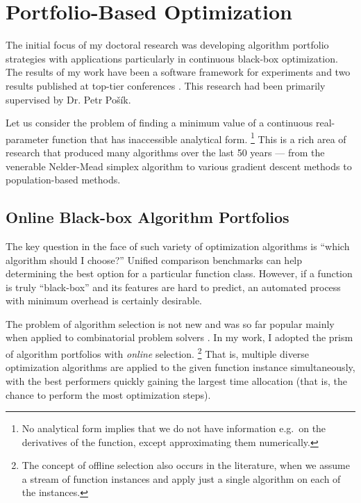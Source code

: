 \chapter{Portfolio-Based Optimization}
\label{app:opt}

The initial focus of my doctoral research
was developing algorithm portfolio strategies
with applications particularly in continuous black-box optimization.
The results of my work have been a software framework for experiments
\citep{COCOpf}
and two results published at top-tier conferences \citep{optpf,ndsqistep}.
This research had been primarily supervised by Dr. Petr Pošík.

Let us consider the problem of finding a minimum value of a continuous
real-parameter function that has inaccessible analytical form.%
\footnote{No analytical form implies that we do not have information
e.g.\ on the derivatives of the function, except approximating
them numerically.}
This is a rich area of research that produced many algorithms over
the last 50 years --- from the venerable Nelder-Mead simplex
algorithm \citep{NM1} to various gradient descent methods to
population-based methods.

\section{Online Black-box Algorithm Portfolios}

The key question in the face of such variety of optimization
algorithms is ``which algorithm should I choose?''
Unified comparison benchmarks \citep{COCO1}
can help determining the best option for a particular function class.
However, if a function is truly ``black-box'' and its features
are hard to predict, an automated process with minimum overhead
is certainly desirable.

The problem of algorithm selection is not new \citep{Rice}
and was so far popular mainly when applied to
combinatorial problem solvers \citep{combpfsurvey}.
In my work, I adopted the prism of algorithm portfolios \citep{algportfolios}
with \textit{online} selection.%
\footnote{The concept of offline selection also occurs in the literature,
	when we assume a stream of function instances and apply just a single
	algorithm on each of the instances.}
That is, multiple diverse optimization algorithms are applied
to the given function instance simultaneously, with the best
performers quickly gaining the largest time allocation (that is,
the chance to perform the most optimization steps).

